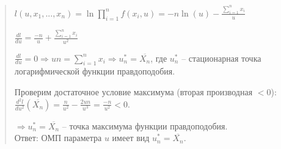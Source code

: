 \documentclass{article}
\begin{document}
\begin{quote}
$l(u, x_1, ..., x_n) = \ln{\prod_{i = 1}^n{f(x_i, u)}} = -n\ln{(u)} - \frac{\sum_{i = 1}^{n}{x_i}}{u}$

$\frac{dl}{du} = \frac{-n}{u} + \frac{\sum_{i = 1}^{n}{x_i}}{u^2}$

$\frac{dl}{du} = 0 \Longrightarrow un = \sum_{i = 1}^{n}{x_i} \Longrightarrow u^{*}_n = \overline{X_n}$,
где $u^{*}_n$ -- стационарная точка логарифмической функции правдоподобия.

Проверим достаточное условие максимума (вторая производная $ < 0$): \\
$\frac{d^2l}{du^2}(\overline{X_n}) = \frac{n}{u^2} - \frac{2un}{u^3} = \frac{-n}{u^2} < 0$.

$\Longrightarrow u^{*}_n = \overline{X_n}$ -- точка максимума функции правдоподобия.\\
Ответ: ОМП параметра $u$ имеет вид $u^{*}_n = \overline{X_n}$.

\end{quote}
\end{document}
